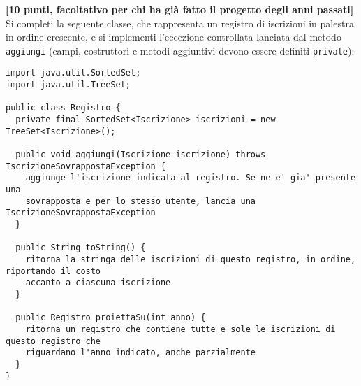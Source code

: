 \documentclass{article}[10pt]
\newcounter{esnu}
\newenvironment{esercizio}{\medskip \noindent {\bf Esercizio\addtocounter{esnu}{1} \arabic{esnu}}}{}
\begin{document}
\begin{esercizio}
  \textbf{[10 punti, facoltativo per chi ha gi\`a fatto il progetto degli anni passati]}
  Si completi la seguente classe, che rappresenta un registro di iscrizioni in palestra
  in ordine crescente,
  e si implementi l'eccezione controllata lanciata dal metodo \texttt{aggiungi}
  (campi, costruttori e metodi aggiuntivi devono essere definiti \texttt{private}):

  {\small\begin{verbatim}
import java.util.SortedSet;
import java.util.TreeSet;

public class Registro {
  private final SortedSet<Iscrizione> iscrizioni = new TreeSet<Iscrizione>();
  
  public void aggiungi(Iscrizione iscrizione) throws IscrizioneSovrappostaException {
    aggiunge l'iscrizione indicata al registro. Se ne e' gia' presente una
    sovrapposta e per lo stesso utente, lancia una IscrizioneSovrappostaException
  }

  public String toString() {
    ritorna la stringa delle iscrizioni di questo registro, in ordine, riportando il costo
    accanto a ciascuna iscrizione
  }

  public Registro proiettaSu(int anno) {
    ritorna un registro che contiene tutte e sole le iscrizioni di questo registro che
    riguardano l'anno indicato, anche parzialmente
  }
}
  \end{verbatim}}

\end{esercizio}
\end{document}
